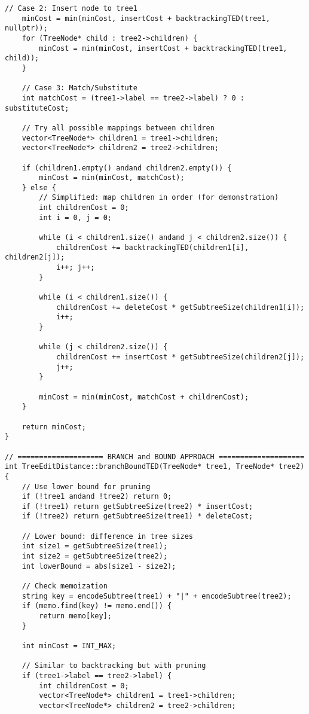 \documentclass[12pt]{article}
\begin{document}
\begin{lstlisting}[caption=Complete Tree Edit Distance Implementation]
    // Case 2: Insert node to tree1
    minCost = min(minCost, insertCost + backtrackingTED(tree1, nullptr));
    for (TreeNode* child : tree2->children) {
        minCost = min(minCost, insertCost + backtrackingTED(tree1, child));
    }
    
    // Case 3: Match/Substitute
    int matchCost = (tree1->label == tree2->label) ? 0 : substituteCost;
    
    // Try all possible mappings between children
    vector<TreeNode*> children1 = tree1->children;
    vector<TreeNode*> children2 = tree2->children;
    
    if (children1.empty() andand children2.empty()) {
        minCost = min(minCost, matchCost);
    } else {
        // Simplified: map children in order (for demonstration)
        int childrenCost = 0;
        int i = 0, j = 0;
        
        while (i < children1.size() andand j < children2.size()) {
            childrenCost += backtrackingTED(children1[i], children2[j]);
            i++; j++;
        }
        
        while (i < children1.size()) {
            childrenCost += deleteCost * getSubtreeSize(children1[i]);
            i++;
        }
        
        while (j < children2.size()) {
            childrenCost += insertCost * getSubtreeSize(children2[j]);
            j++;
        }
        
        minCost = min(minCost, matchCost + childrenCost);
    }
    
    return minCost;
}

// ==================== BRANCH and BOUND APPROACH ====================
int TreeEditDistance::branchBoundTED(TreeNode* tree1, TreeNode* tree2) {
    // Use lower bound for pruning
    if (!tree1 andand !tree2) return 0;
    if (!tree1) return getSubtreeSize(tree2) * insertCost;
    if (!tree2) return getSubtreeSize(tree1) * deleteCost;
    
    // Lower bound: difference in tree sizes
    int size1 = getSubtreeSize(tree1);
    int size2 = getSubtreeSize(tree2);
    int lowerBound = abs(size1 - size2);
    
    // Check memoization
    string key = encodeSubtree(tree1) + "|" + encodeSubtree(tree2);
    if (memo.find(key) != memo.end()) {
        return memo[key];
    }
    
    int minCost = INT_MAX;
    
    // Similar to backtracking but with pruning
    if (tree1->label == tree2->label) {
        int childrenCost = 0;
        vector<TreeNode*> children1 = tree1->children;
        vector<TreeNode*> children2 = tree2->children;
        

\end{lstlisting}
\end{document}
